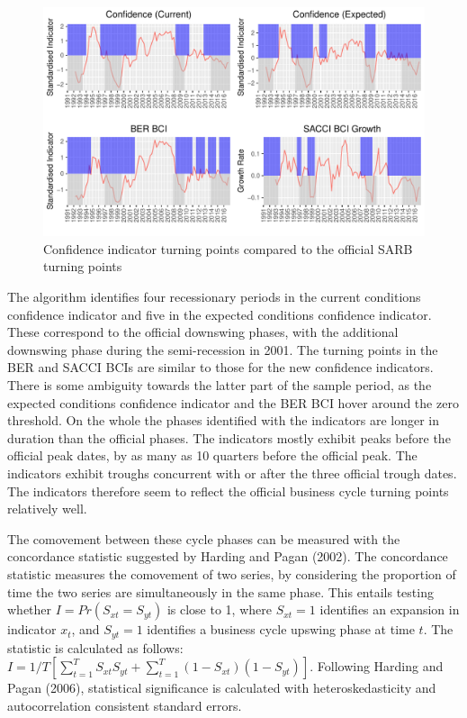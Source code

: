 \documentclass[11pt,]{article}
\begin{document}
\begin{figure}
\centering
\includegraphics{BCon_5_Journal_files/figure-latex/figure13-1.pdf}
\caption{Confidence indicator turning points compared to the official
SARB turning points}
\end{figure}

The algorithm identifies four recessionary periods in the current
conditions confidence indicator and five in the expected conditions
confidence indicator. These correspond to the official downswing phases,
with the additional downswing phase during the semi-recession in 2001.
The turning points in the BER and SACCI BCIs are similar to those for
the new confidence indicators. There is some ambiguity towards the
latter part of the sample period, as the expected conditions confidence
indicator and the BER BCI hover around the zero threshold. On the whole
the phases identified with the indicators are longer in duration than
the official phases. The indicators mostly exhibit peaks before the
official peak dates, by as many as 10 quarters before the official peak.
The indicators exhibit troughs concurrent with or after the three
official trough dates. The indicators therefore seem to reflect the
official business cycle turning points relatively well.

The comovement between these cycle phases can be measured with the
concordance statistic suggested by Harding and Pagan (2002). The
concordance statistic measures the comovement of two series, by
considering the proportion of time the two series are simultaneously in
the same phase. This entails testing whether \(I=Pr(S_{xt} =S_{yt})\) is
close to 1, where \(S_{xt} = 1\) identifies an expansion in indicator
\(x_t\), and \(S_{yt}=1\) identifies a business cycle upswing phase at
time \(t\). The statistic is calculated as follows:
\(I = 1/T [\sum^T_{t=1} S_{xt} S_{yt} + \sum^T_{t=1} (1-S_{xt}) (1- S_{yt})]\).
Following Harding and Pagan (2006), statistical significance is
calculated with heteroskedasticity and autocorrelation consistent
standard errors.
\end{document}
